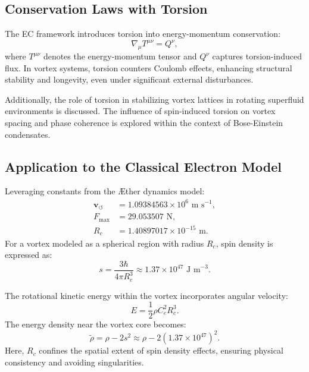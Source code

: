 \documentclass[a4paper,10pt]{article}
\begin{document}
\subsection*{Conservation Laws with Torsion}


The EC framework introduces torsion into energy-momentum conservation:
\begin{equation*}
\nabla_{\mu} T^{\mu\nu} = Q^{\nu},
\end{equation*}
where $T^{\mu\nu}$ denotes the energy-momentum tensor and $Q^{\nu}$ captures torsion-induced flux. In vortex systems, torsion counters Coulomb effects, enhancing structural stability and longevity, even under significant external disturbances.


Additionally, the role of torsion in stabilizing vortex lattices in rotating superfluid environments is discussed. The influence of spin-induced torsion on vortex spacing and phase coherence is explored within the context of Bose-Einstein condensates.


\subsection*{Application to the Classical Electron Model}


Leveraging constants from the Æther dynamics model:
\begin{align}
\mathbf{v}_{\scriptscriptstyle\boldsymbol{\circlearrowleft}} &= 1.09384563 \times 10^6 \text{ m s}^{-1}, \\
F_{\max} &= 29.053507 \text{ N}, \\
R_c &= 1.40897017 \times 10^{-15} \text{ m}.
\end{align}
For a vortex modeled as a spherical region with radius $R_c$, spin density is expressed as:
\begin{equation*}
s = \frac{3\hbar}{4\pi R_c^3} \approx 1.37 \times 10^{47} \text{ J m}^{-3}.
\end{equation*}


The rotational kinetic energy within the vortex incorporates angular velocity:
\begin{equation*}
E = \frac{1}{2} \rho C_e^2 R_c^3.
\end{equation*}
The energy density near the vortex core becomes:
\begin{equation*}
\tilde{\rho} = \rho - 2s^2 \approx \rho - 2(1.37 \times 10^{47})^2.
\end{equation*}
Here, $R_c$ confines the spatial extent of spin density effects, ensuring physical consistency and avoiding singularities.
\end{document}
